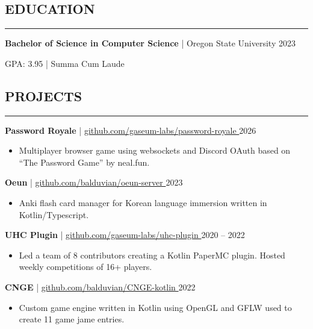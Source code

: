 \documentclass{article}
\newcommand{\HRule}[1][\medskipamount]{
	\par
	\vspace*{\dimexpr-\parskip-\baselineskip+#1}
	\noindent\rule{\linewidth}{0.2mm}\par
	\vspace*{\dimexpr-\parskip+0.1\baselineskip+#1}
}
\begin{document}
\subsection*{EDUCATION}
\HRule[6pt]

\noindent
\textbf{Bachelor of Science in Computer Science} | Oregon State University
\hspace*{\fill}
2023

\noindent
GPA: 3.95 | Summa Cum Laude

\subsection*{PROJECTS}
\HRule[6pt]

\noindent
\textbf{Password Royale} | \href{https://github.com/gaseum-labs/password-royale}{
	github.com/gaseum-labs/password-royale
}
\hspace*{\fill}
2026

\begin{itemize}
	\item Multiplayer browser game using websockets and Discord OAuth based on ``The Password Game'' by neal.fun.
\end{itemize}

\noindent
\textbf{Oeun} | \href{https://github.com/balduvian/oeun-server}{
	github.com/balduvian/oeun-server
}
\hspace*{\fill}
2023

\begin{itemize}
	\item Anki flash card manager for Korean language immersion written in Kotlin/Typescript.
\end{itemize}

\noindent
\textbf{UHC Plugin} |
\href{https://github.com/gaseum-labs/uhc-plugin}{
	github.com/gaseum-labs/uhc-plugin
}
\hspace*{\fill}
2020 -- 2022

\begin{itemize}
	\item Led a team of 8 contributors creating a Kotlin PaperMC plugin. Hosted weekly competitions of 16+ players.
\end{itemize}

\noindent
\textbf{CNGE} | \href{https://github.com/balduvian/CNGE-kotlin}{
	github.com/balduvian/CNGE-kotlin
}
\hspace*{\fill}
2022

\begin{itemize}
	\item Custom game engine written in Kotlin using OpenGL and GFLW used to create 11 game jame entries.
\end{itemize}

\vspace*{\fill}
\hspace*{\fill}{Written in \LaTeX}
\end{document}
